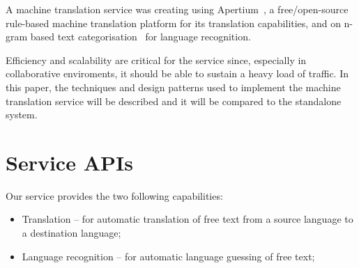 \documentclass[11pt]{article}
\begin{document}
A machine translation service was creating using Apertium~\citep{armentano05p}, 
a free/open-source rule-based machine translation platform for its translation 
capabilities, and on n-gram based text categorisation~\citep{textcat} for language 
recognition. %


Efficiency and scalability are critical for the service since, especially in collaborative 
enviroments, it should be able to sustain a heavy load of traffic. In this paper, the 
techniques and design patterns used to implement the machine translation service will
be described and it will be compared to the standalone system.


\section{Service APIs}

Our service provides the two following capabilities:

\begin{itemize}
  \item Translation -- for automatic translation of free text from a source language to a destination language;
  \item Language recognition -- for automatic language guessing of free text;
\end{itemize}
\end{document}
